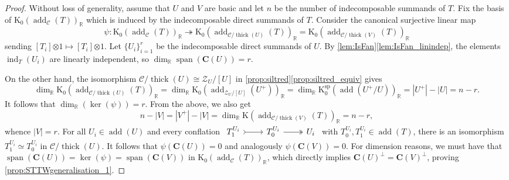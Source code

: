 \documentclass[10pt,twoside, a4paper,reqno]{amsart}
\DeclareMathOperator{\add}{add}
\DeclareMathOperator{\thick}{thick}
\DeclareMathOperator{\spann}{span}
\DeclareMathOperator{\ind}{ind}
\newcommand{\R}{\mathbb{R}}
\newcommand{\calC}{\mathcal{C}}
\newcommand{\calZ}{\mathcal{Z}}
\newcommand{\boldC}{\mathbf{C}}
\newcommand{\K}{\mathrm{K}}
\newcommand{\Ksp}{\mathrm{K}^{\mathrm{sp}}}
\theoremstyle{definition}
\begin{document}
\begin{proof}
Without loss of generality, assume that $U$ and $V$ are basic and let $n$ be the number of indecomposable summands of $T$. Fix the basis of $\K_0(\add_{\calC} (T))_\R$ which is induced by the indecomposable direct summands of $T$. Consider the canonical surjective linear map
\[ \psi: \K_0(\add_{\calC}(T))_\R \twoheadrightarrow \K_0(\add_{\calC/\thick(U)}(T))_\R = \K_0(\add_{\calC/\thick(V)}(T))_\R \]
sending $[T_i] {\otimes 1} \mapsto [T_i] {\otimes 1} $. Let $\{U_i\}_{i=1}^r$ be the indecomposable direct summands of $U$. By \cref{lem:IsFan}\eqref{lem:IsFan_linindep}, the elements $\ind_T(U_i)$ are linearly independent, so $\dim_\R \spann( \boldC(U))= r$.

On the other hand, the isomorphism $\calC/\thick(U) \cong \calZ_U/[U]$ in \cref{prop:siltred}\eqref{prop:siltred_equiv} gives
\[ \dim_\R \K_0(\add_{\calC/\thick(U)}(T))_\R = \dim_\R \K_0(\add_{\calZ_U/[U]}(U^+))_\R =  \dim_\R \Ksp_0(\add(U^+/U))_\R = |U^+| - |U| = n-r. \]
It follows that $\dim_\R (\ker (\psi))=r$. From the above, we also get
\[ n- |V| =  |V^+|- |V| = \dim_\R \K(\add_{\calC/\thick(V)} (T))_\R = n-r,\]
whence $|V|=r$. For all $U_i \in \add(U)$ and every conflation $\begin{tikzcd} T_1^{U_i} \arrow[r, tail] &T_0^{U_i} \arrow[r, two heads] & U_i \end{tikzcd}$ with $T_0^{U_i}, T_1^{U_i} \in \add(T)$, there is an isomorphism $T_1^{U_i} \simeq T_0^{U_i}$ in $\calC/\thick(U)$. It follows that $\psi(\boldC(U)) = 0$ and analogously $\psi(\boldC(V)) = 0$. For dimension reasons, we must have that $\spann(\boldC(U)) = \ker(\psi) =  \spann(\boldC(V))$ in $\K_0(\add_{\calC}(T))_\R$, which directly implies $\boldC(U)^\perp = \boldC(V)^\perp$, proving \eqref{prop:STTWgeneralisation_1}.



\end{proof}
\end{document}

